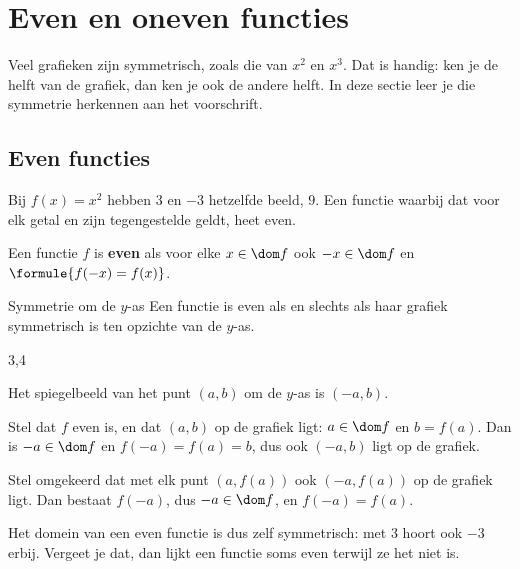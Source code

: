 \section{Even en oneven functies}

Veel grafieken zijn symmetrisch, zoals die van $x^2$ en $x^3$. Dat is handig: ken je de helft van de grafiek, dan ken je ook de andere helft. In deze sectie leer je die symmetrie herkennen aan het voorschrift.

\subsection{Even functies}

Bij $f(x) = x^2$ hebben $3$ en $-3$ hetzelfde beeld, $9$. Een functie waarbij dat voor elk getal en zijn tegengestelde geldt, heet even.

\begin{theorie}
Een functie $f$ is \textbf{\textcolor{accent}{even}} als voor elke $x \in \dom f$ ook $-x \in \dom f$ en $\formule{f(-x) = f(x)}$.

\begin{stelling}{Symmetrie om de \mbox{$y$-as}}
Een functie is even als en slechts als haar grafiek symmetrisch is ten opzichte van de \mbox{$y$-as}.
\end{stelling}

\begin{alleenvoor}{3,4}
\begin{bewijs}
Het spiegelbeeld van het punt $(a, b)$ om de $y$-as is $(-a, b)$.

Stel dat $f$ even is, en dat $(a, b)$ op de grafiek ligt: $a \in \dom f$ en $b = f(a)$. Dan is $-a \in \dom f$ en $f(-a) = f(a) = b$, dus ook $(-a, b)$ ligt op de grafiek.

Stel omgekeerd dat met elk punt $(a, f(a))$ ook $(-a, f(a))$ op de grafiek ligt. Dan bestaat $f(-a)$, dus $-a \in \dom f$, en $f(-a) = f(a)$.
\end{bewijs}
\end{alleenvoor}
\end{theorie}

Het domein van een even functie is dus zelf symmetrisch: met $3$ hoort ook $-3$ erbij. Vergeet je dat, dan lijkt een functie soms even terwijl ze het niet is.


